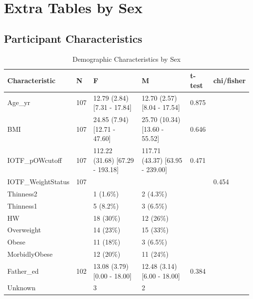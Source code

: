 \documentclass[
]{article}
\begin{document}
\clearpage
\FloatBarrier

\hypertarget{extra-tables-by-sex}{%
\section{Extra Tables by Sex}\label{extra-tables-by-sex}}

\FloatBarrier

\hypertarget{participant-characteristics-1}{%
\subsection{Participant
Characteristics}\label{participant-characteristics-1}}

\begin{table}[!h]

\caption{\label{tab:Demo_sex_tab}Demographic Characteristics by Sex}
\centering
\begin{tabular}[t]{llllll}
\toprule
Characteristic & N & F & M & t-test & chi/fisher\\
\midrule
Age\_yr & 107 & 12.79 (2.84)   [7.31 - 17.84] & 12.70 (2.57)   [8.04 - 17.54] & 0.875 & \\
BMI & 107 & 24.85 (7.94)   [12.71 - 47.60] & 25.70 (10.34)   [13.60 - 55.52] & 0.646 & \\
IOTF\_pOWcutoff & 107 & 112.22 (31.68)   [67.29 - 193.18] & 117.71 (43.37)   [63.95 - 239.00] & 0.471 & \\
IOTF\_WeightStatus & 107 &  &  &  & 0.454\\
\hspace{1em}Thinness2 &  & 1 (1.6\%) & 2 (4.3\%) &  & \\
\addlinespace
\hspace{1em}Thinness1 &  & 5 (8.2\%) & 3 (6.5\%) &  & \\
\hspace{1em}HW &  & 18 (30\%) & 12 (26\%) &  & \\
\hspace{1em}Overweight &  & 14 (23\%) & 15 (33\%) &  & \\
\hspace{1em}Obese &  & 11 (18\%) & 3 (6.5\%) &  & \\
\hspace{1em}MorbidlyObese &  & 12 (20\%) & 11 (24\%) &  & \\
\addlinespace
Father\_ed & 102 & 13.08 (3.79)   [0.00 - 18.00] & 12.48 (3.14)   [6.00 - 18.00] & 0.384 & \\
\hspace{1em}Unknown &  & 3 & 2 &  & \\

\end{tabular}
\end{table}
\end{document}
